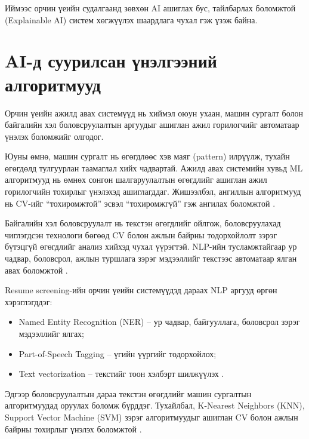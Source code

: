 \par{}Иймээс орчин үеийн судалгаанд зөвхөн AI ашиглах бус, тайлбарлах боломжтой (Explainable AI) систем хөгжүүлэх шаардлага чухал гэж үзэж байна.

\section{AI-д суурилсан үнэлгээний алгоритмууд}

\par{}Орчин үеийн ажилд авах системүүд нь хиймэл оюун ухаан, машин сургалт болон байгалийн хэл боловсруулалтын аргуудыг ашиглан ажил горилогчийг автоматаар үнэлэх боломжийг олгодог.

\par{}Юуны өмнө, машин сургалт нь өгөгдлөөс хэв маяг (pattern) илрүүлж, тухайн өгөгдөлд тулгуурлан таамаглал хийх чадвартай. Ажилд авах системийн хувьд ML алгоритмууд нь өмнөх сонгон шалгаруулалтын өгөгдлийг ашиглан ажил горилогчийн тохирлыг үнэлэхэд ашиглагддаг. Жишээлбэл, ангиллын алгоритмууд нь CV-ийг “тохиромжтой” эсвэл “тохиромжгүй” гэж ангилах боломжтой \cite{smart_hiring_ai}.

\par{}Байгалийн хэл боловсруулалт нь текстэн өгөгдлийг ойлгож, боловсруулахад чиглэгдсэн технологи бөгөөд CV болон ажлын байрны тодорхойлолт зэрэг бүтэцгүй өгөгдлийг анализ хийхэд чухал үүрэгтэй. NLP-ийн тусламжтайгаар ур чадвар, боловсрол, ажлын туршлага зэрэг мэдээллийг текстээс автоматаар ялган авах боломжтой \cite{nlp_resume_parsing}.

Resume screening-ийн орчин үеийн системүүдэд дараах NLP аргууд өргөн хэрэглэгддэг:
\begin{itemize}
    \item Named Entity Recognition (NER) – ур чадвар, байгууллага, боловсрол зэрэг мэдээллийг ялгах;
    \item Part-of-Speech Tagging – үгийн үүргийг тодорхойлох;
    \item Text vectorization – текстийг тоон хэлбэрт шилжүүлэх \cite{mikolov2013word2vec}.
\end{itemize}

\par{}Эдгээр боловсруулалтын дараа текстэн өгөгдлийг машин сургалтын алгоритмуудад оруулах боломж бүрддэг. Тухайлбал, K-Nearest Neighbors (KNN), Support Vector Machine (SVM) зэрэг алгоритмуудыг ашиглан CV болон ажлын байрны тохирлыг үнэлэх боломжтой \cite{nlp_resume_parsing}.

